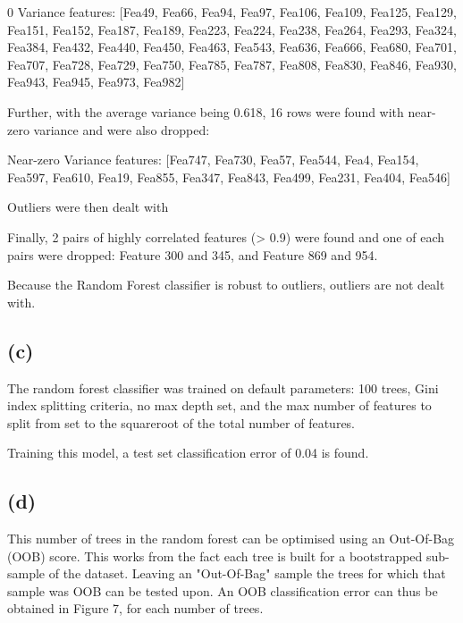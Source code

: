 \documentclass[12pt]{report} %
\begin{document}
\begin{center}
    0 Variance features: [Fea49, Fea66, Fea94, Fea97, Fea106, Fea109, Fea125, Fea129, Fea151, Fea152, Fea187, Fea189, Fea223, Fea224, Fea238, Fea264, Fea293, Fea324, Fea384, Fea432, Fea440, Fea450, Fea463, Fea543, Fea636, Fea666, Fea680, Fea701, Fea707, Fea728, Fea729, Fea750, Fea785, Fea787, Fea808, Fea830, Fea846, Fea930, Fea943, Fea945, Fea973, Fea982]
\end{center}

Further, with the average variance being 0.618, 16 rows were found with near-zero variance and were also dropped:

\begin{center}
    Near-zero Variance features: [Fea747, Fea730, Fea57, Fea544, Fea4, Fea154, Fea597, Fea610, Fea19, Fea855, Fea347, Fea843, Fea499, Fea231, Fea404, Fea546]
\end{center}

Outliers were then dealt with

Finally, 2 pairs of highly correlated features (> 0.9) were found and one of each pairs were dropped: Feature 300 and 345, and Feature 869 and 954.

Because the Random Forest classifier is robust to outliers, outliers are not dealt with\cite[pp. 346-347]{james2013introduction}.


\subsection*{(c)}

The random forest classifier was trained on default parameters: 100 trees, Gini index splitting criteria, no max depth set, and the max number of features to split from set to the squareroot of the total number of features.  

Training this model, a test set classification error of 0.04 is found.

\subsection*{(d)}

This number of trees in the random forest can be optimised using an Out-Of-Bag (OOB) score. This works from the fact each tree is built for a bootstrapped sub-sample of the dataset. Leaving an "Out-Of-Bag" sample the trees for which that sample was OOB can be tested upon. An OOB classification error can thus be obtained in Figure 7, for each number of trees\cite[p. 345]{james2013introduction}.  
\end{document}
